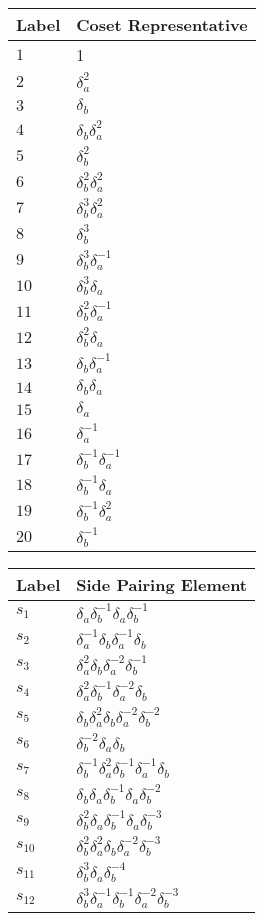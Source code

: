\documentclass{article}
\begin{document}

\begin{center}
\begin{tabular}{ll}
\toprule
Label & Coset Representative\\
\midrule
$1$ & 1 \\
$2$ & $\delta_a^{2}$ \\
$3$ & $\delta_b^{}$ \\
$4$ & $\delta_b^{}\delta_a^{2}$ \\
$5$ & $\delta_b^{2}$ \\
$6$ & $\delta_b^{2}\delta_a^{2}$ \\
$7$ & $\delta_b^{3}\delta_a^{2}$ \\
$8$ & $\delta_b^{3}$ \\
$9$ & $\delta_b^{3}\delta_a^{-1}$ \\
$10$ & $\delta_b^{3}\delta_a^{}$ \\
$11$ & $\delta_b^{2}\delta_a^{-1}$ \\
$12$ & $\delta_b^{2}\delta_a^{}$ \\
$13$ & $\delta_b^{}\delta_a^{-1}$ \\
$14$ & $\delta_b^{}\delta_a^{}$ \\
$15$ & $\delta_a^{}$ \\
$16$ & $\delta_a^{-1}$ \\
$17$ & $\delta_b^{-1}\delta_a^{-1}$ \\
$18$ & $\delta_b^{-1}\delta_a^{}$ \\
$19$ & $\delta_b^{-1}\delta_a^{2}$ \\
$20$ & $\delta_b^{-1}$ \\
\bottomrule
\end{tabular}
\hfill
\begin{tabular}{ll}
\toprule
Label & Side Pairing Element\\
\midrule
$s_{1}$ & $\delta_a^{}\delta_b^{-1}\delta_a^{}\delta_b^{-1}$ \\
$s_{2}$ & $\delta_a^{-1}\delta_b^{}\delta_a^{-1}\delta_b^{}$ \\
$s_{3}$ & $\delta_a^{2}\delta_b^{}\delta_a^{-2}\delta_b^{-1}$ \\
$s_{4}$ & $\delta_a^{2}\delta_b^{-1}\delta_a^{-2}\delta_b^{}$ \\
$s_{5}$ & $\delta_b^{}\delta_a^{2}\delta_b^{}\delta_a^{-2}\delta_b^{-2}$ \\
$s_{6}$ & $\delta_b^{-2}\delta_a^{}\delta_b^{}$ \\
$s_{7}$ & $\delta_b^{-1}\delta_a^{2}\delta_b^{-1}\delta_a^{-1}\delta_b^{}$ \\
$s_{8}$ & $\delta_b^{}\delta_a^{}\delta_b^{-1}\delta_a^{}\delta_b^{-2}$ \\
$s_{9}$ & $\delta_b^{2}\delta_a^{}\delta_b^{-1}\delta_a^{}\delta_b^{-3}$ \\
$s_{10}$ & $\delta_b^{2}\delta_a^{2}\delta_b^{}\delta_a^{-2}\delta_b^{-3}$ \\
$s_{11}$ & $\delta_b^{3}\delta_a^{}\delta_b^{-4}$ \\
$s_{12}$ & $\delta_b^{3}\delta_a^{-1}\delta_b^{-1}\delta_a^{-2}\delta_b^{-3}$ \\
\bottomrule
\end{tabular}
\end{center}

\thispagestyle{empty}
\end{document}
